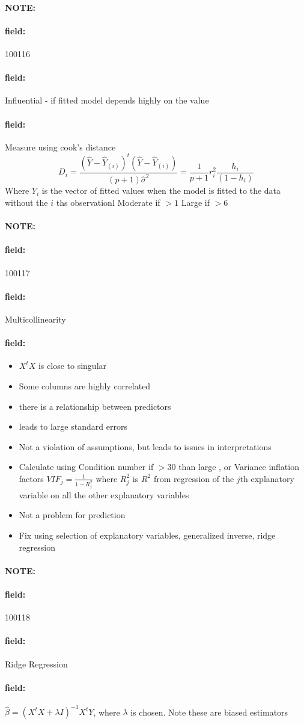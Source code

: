 \documentclass[12pt]{article}
\newenvironment{note}{\paragraph{NOTE:}}{}
\newenvironment{field}{\paragraph{field:}}{}
\begin{document}
\begin{note} \begin{field} \tiny 100116 \end{field}
  \begin{field}
    Influential - if fitted model depends highly on the value
  \end{field}
  \begin{field}
    Measure using cook's distance
    $$ D_i = \frac{(\hat{Y} - \hat{Y}_{(i)})^t(\hat{Y} - \hat{Y}_{(i)})}{(p+1)\hat{\sigma}^2} = \frac{1}{p+1}r_i^2 \frac{h_i}{(1 - h_i)}$$
    Where $Y_{i}$ is the vector of fitted values when the model is fitted to the data without the $i$ ths observationl Moderate if $>1 $ Large if $>6$
  \end{field}
\end{note}


\begin{note} \begin{field} \tiny 100117 \end{field}
  \begin{field}
    Multicollinearity
  \end{field}
  \begin{field}
    \begin{itemize}
      \item $X^tX$ is close to singular
      \item Some columns are highly correlated
      \item there is a relationship between predictors \item leads to large standard errors
      \item Not a violation of assumptions, but leads to issues in interpretations
      \item Calculate using Condition number if $>30$ than large , or Variance inflation factors $VIF_j = \frac{1}{1 - R^2_j}$ where $R^2_j$ is $R^2$ from regression of the $j$th explanatory variable on all the other explanatory variables
      \item Not a problem for prediction
      \item Fix using selection of explanatory variables, generalized inverse, ridge regression
    \end{itemize}
  \end{field}
\end{note}

\begin{note} \begin{field} \tiny 100118 \end{field}
  \begin{field}
    Ridge Regression
  \end{field}
  \begin{field}
    $\hat{\beta} = (X^tX + \lambda I)^{-1} X^t Y$, where $\lambda$ is chosen. Note these are biased estimators
  \end{field}
\end{note}
\end{document}
